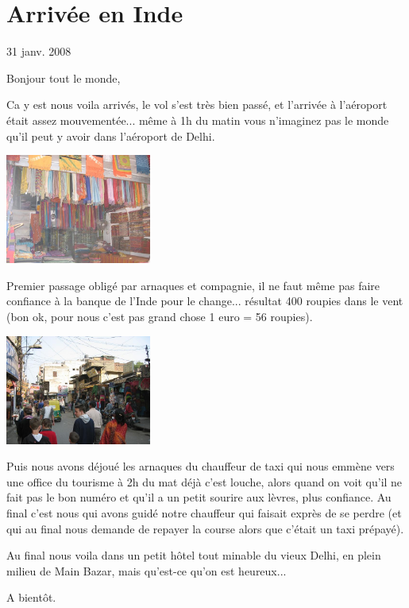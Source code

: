 \section{Arrivée en Inde}

31 janv. 2008

\begin{multicols}{2}

Bonjour tout le monde,

Ca y est nous voila arrivés, le vol s'est très bien passé, et l'arrivée à l'aéroport était assez mouvementée... même à 1h du matin vous n'imaginez pas le monde qu'il peut y avoir dans l'aéroport de Delhi.

\hspace*{-0.65cm}
\includegraphics[width=4.8cm]{articles/Arrivee-en-inde/magasin.jpg}

Premier passage obligé par arnaques et compagnie, il ne faut même pas faire confiance à la banque de l'Inde pour le change... résultat 400 roupies dans le vent (bon ok, pour nous c'est pas grand chose 1 euro = 56 roupies).

\hspace*{-0.65cm}

\includegraphics[width=4.8cm]{articles/Arrivee-en-inde/rue.jpg}

Puis nous avons déjoué les arnaques du chauffeur de taxi qui nous emmène vers une office du tourisme à 2h du mat déjà c'est louche, alors quand on voit qu'il ne fait pas le bon numéro et qu'il a un petit sourire aux lèvres, plus confiance. Au final c'est nous qui avons guidé notre chauffeur qui faisait exprès de se perdre (et qui au final nous demande de repayer la course alors que c'était un taxi prépayé).

Au final nous voila dans un petit hôtel tout minable du vieux Delhi, en plein milieu de Main Bazar, mais qu'est-ce qu'on est heureux...

A bientôt.


\end{multicols}


